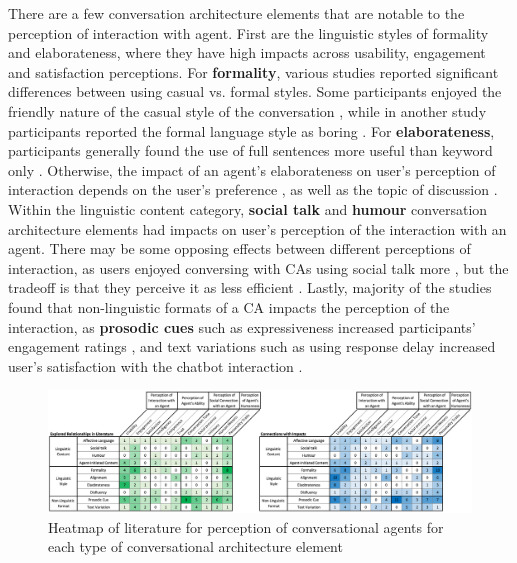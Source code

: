 \documentclass[sigconf,screen,review, anonymous]{acmart}
\newcommand{\cmt}[1]{}%
\begin{document}
There are a few conversation architecture elements that are notable to the perception of interaction with agent. First are the linguistic styles of formality and elaborateness, where they have high impacts across usability, engagement and satisfaction perceptions. For \textbf{formality}, various studies reported significant differences between using casual vs. formal styles. Some participants enjoyed the friendly nature of the casual style of the conversation \cite{cox2022does}\cmt{[27]}, while in another study participants reported the formal language style as boring \cite{kim2019comparing}\cmt{[89]}. For \textbf{elaborateness}, participants generally found the use of full sentences more useful than keyword only \cite{haas2022keep}\cmt{[78]}\cite{roy2021users}\cmt{[71]}. Otherwise, the impact of an agent's elaborateness on user's perception of interaction depends on the user's preference \cite{miehle2018exploring}\cmt{[51]}, as well as the topic of discussion \cite{haas2022keep}\cmt{[78]}. Within the linguistic content category, \textbf{social talk} and \textbf{humour} conversation architecture elements had impacts on user's perception of the interaction with an agent. There may be some opposing effects between different perceptions of interaction, as users enjoyed conversing with CAs using social talk more \cite{lee2020hear}\cmt{[23]}\cite{roy2021users}\cmt{[71]}, but the tradeoff is that they perceive it as less efficient \cite{roy2021users}\cmt{[71]}. Lastly, majority of the studies found that non-linguistic formats of a CA impacts the perception of the interaction, as \textbf{prosodic cues} such as expressiveness increased participants' engagement ratings \cite{zhu2022effects}\cmt{[26]}, and text variations such as using response delay increased user's satisfaction with the chatbot interaction \cite{gnewuch2018faster}\cmt{[19]}.

\begin{figure}[]
  \centering
  \includegraphics[width=\textwidth]{fig-heatmap-coverage.png}
  \caption{Heatmap of literature for perception of conversational agents for each type of conversational architecture element}
  \label{fig:heatmap-coverage}
\end{figure}
\end{document}
